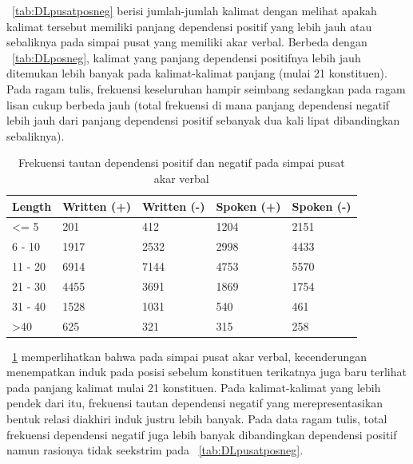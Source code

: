 \documentclass[10pt, a4paper, conference, compsocconf]{IEEEtran}
\begin{document}
\tab~\ref{tab:DLpusatposneg} berisi jumlah-jumlah kalimat dengan melihat apakah kalimat tersebut memiliki panjang dependensi positif yang lebih jauh atau sebaliknya pada simpai pusat yang memiliki akar verbal. Berbeda dengan \tab~\ref{tab:DLposneg}, kalimat yang panjang dependensi positifnya lebih jauh ditemukan lebih banyak pada kalimat-kalimat panjang (mulai 21 konstituen). Pada ragam tulis, frekuensi keseluruhan hampir seimbang sedangkan pada ragam lisan cukup berbeda jauh (total frekuensi di mana panjang dependensi negatif lebih jauh dari panjang dependensi positif sebanyak dua kali lipat dibandingkan sebaliknya). 

\begin{table}
\begin{center}
\caption{Frekuensi tautan dependensi positif dan negatif pada simpai pusat akar verbal}  \label{tab:tautanpusatposneg}
\begin{tabular}{p{1.1cm} p{1.2cm} p{1.2cm} p{1.3cm} p{1.3cm}}
    \hline
Length & Written (+) & Written (-) & Spoken (+) & Spoken (-) \\ \hline
\textless= 5 	& 201	& 412 & 1204 & 2151 \\
6 - 10 		& 1917	& 2532 & 2998 & 4433 \\
11 - 20 		& 6914 	& 7144 & 4753 & 5570 \\
21 - 30 		& 4455	& 3691 & 1869 & 1754 \\
31 - 40 		& 1528	& 1031 & 540 & 461 \\
\textgreater 40 	& 625	& 321 & 315 & 258 \\ \hline
   \end{tabular}
\end{center}
\end{table}

\tab~\ref{tab:tautanpusatposneg} memperlihatkan bahwa pada simpai pusat akar verbal, kecenderungan menempatkan induk pada posisi sebelum konstituen terikatnya juga baru terlihat pada panjang kalimat mulai 21 konstituen. Pada kalimat-kalimat yang lebih pendek dari itu, frekuensi tautan dependensi negatif yang merepresentasikan bentuk relasi diakhiri induk justru lebih banyak. Pada data ragam tulis, total frekuensi dependensi negatif juga lebih banyak dibandingkan dependensi positif namun rasionya tidak seekstrim pada \tab~\ref{tab:DLpusatposneg}.
\end{document}
